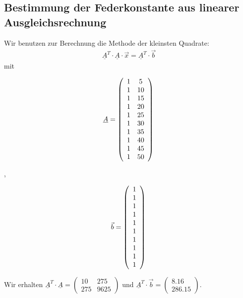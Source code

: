 \subsection{Bestimmung der Federkonstante aus linearer Ausgleichsrechnung}
Wir benutzen zur Berechnung die Methode der kleinsten Quadrate:
\begin{equation}
\begin{aligned}
  \underline{A}^T \cdot \underline{A} \cdot \vec{x} = \underline{A}^T \cdot \vec{b}
\end{aligned}
\end{equation}
mit 
  \begin{minipage}{0.48\linewidth}

    \[
    \underline{A} =
    \left(\begin{array}{cc}
      1 & 5\\
      1 & 10\\
      1 & 15\\
      1 & 20\\
      1 & 25\\
      1 & 30\\
      1 & 35\\
      1 & 40\\
      1 & 45\\
      1 & 50\\
    \end{array} \right)\\
    \]
    \end{minipage}
    \begin{minipage}{0.01\linewidth}
    \vspace{2pt}
    ,
    \end{minipage}
    \begin{minipage}{0.48\linewidth}
    
    \[
    \vec{b} =
    \left(\begin{array}{c}
      1\\
      1\\
      1\\
      1\\
      1\\
      1\\
      1\\
      1\\
      1\\
      1\\
    \end{array} \right) \\
    \]
    
    \end{minipage}
    Wir erhalten $\underline{A}^T \cdot \underline{A} = \begin{pmatrix}
      10 & 275\\ 
      275 & 9625
    \end{pmatrix}$ 
    und $\underline{A}^T \cdot \vec{b} =  \begin{pmatrix}
      8.16\\ 
      286.15
    \end{pmatrix}$.

